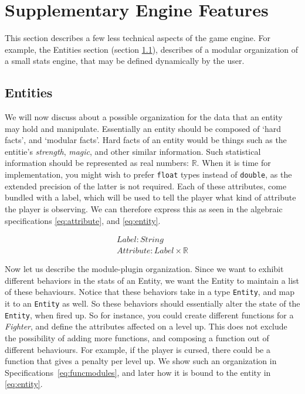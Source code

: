 \section{Supplementary Engine Features}

This section describes a few less technical aspects of the game engine. For
example, the Entities section (section \ref{sec:entities}), describes of a
modular organization of a small stats engine, that may be defined dynamically by
the user.

\subsection{Entities}
\label{sec:entities}

We will now discuss about a possible organization for the data that an entity
may hold and manipulate. Essentially an entity should be composed of `hard
facts', and `modular facts'. Hard facts of an entity would be things such as the
entitie's \textit{strength}, \textit{magic}, and other similar information. Such
statistical information should be represented as real numbers: $\mathbb{R}$.
When it is time for implementation, you might wish to prefer \texttt{float}
types instead of \texttt{double}, as the extended precision of the latter is not
required. Each of these attributes, come bundled with a label, which will be
used to tell the player what kind of attribute the player is observing. We can
therefore express this as seen in the algebraic specifications
\ref{eq:attribute}, and \ref{eq:entity}.

\begin{equation}
\begin{split}
  \label{eq:attribute}
  Label\colon String \\
  Attribute\colon Label \times \mathbb{R}
\end{split}
\end{equation}

Now let us describe the module-plugin organization. Since we want to exhibit
different behaviors in the stats of an Entity, we want the Entity to maintain
a list of these behaviours. Notice that these behaviors take in a type
\texttt{Entity}, and map it to an \texttt{Entity} as well. So these behaviors
should essentially alter the state of the \texttt{Entity}, when fired up. So for
instance, you could create different functions for a \textit{Fighter}, and
define the attributes affected on a level up. This does not exclude the
possibility of adding more functions, and composing a function out of different
behaviours. For example, if the player is cursed, there could be a function that
gives a penalty per level up. We show such an organization in
Specifications~\ref{eq:funcmodules}, and later how it is bound to the entity in
\ref{eq:entity}.

